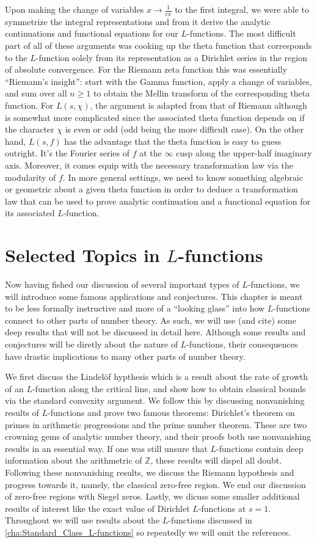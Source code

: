 \documentclass[12pt]{book}
\theoremstyle{definition}\newframedtheorem{method}{Method}
\newcommand{\Z}{\mathbb{Z}}
\newcommand{\<}{\langle}
\renewcommand{\>}{\rangle}
\begin{document}
      Upon making the change of variables $x \to \frac{1}{cx}$ to the first integral, we were able to symmetrize the integral representations and from it derive the analytic continuations and functional equations for our $L$-functions. The most difficult part of all of these arguments was cooking up the theta function that corresponds to the $L$-function solely from its representation as a Dirichlet series in the region of absolute convergence. For the Riemann zeta function this was essentially ``Riemann's insight'': start with the Gamma function, apply a change of variables, and sum over all $n \ge 1$ to obtain the Mellin transform of the corresponding theta function. For $L(s,\chi)$, the argument is adapted from that of Riemann although is somewhat more complicated since the associated theta function depends on if the character $\chi$ is even or odd (odd being the more difficult case). On the other hand, $L(s,f)$ has the advantage that the theta function is easy to guess outright. It's the Fourier series of $f$ at the $\infty$ cusp along the upper-half imaginary axis. Moreover, it comes equip with the necessary transformation law via the modularity of $f$. In more general settings, we need to know something algebraic or geometric about a given theta function in order to deduce a transformation law that can be used to prove analytic continuation and a functional equation for its associated $L$-function.
\chapter{Selected Topics in \texorpdfstring{$L$}{L}-functions}
  Now having fished our discussion of several important types of $L$-functions, we will introduce some famous applications and conjectures. This chapter is meant to be less formally instructive and more of a ``looking glass'' into how $L$-functions connect to other parts of number theory. As such, we will use (and cite) some deep results that will not be discussed in detail here. Although some results and conjectures will be diretly about the nature of $L$-functions, their consequences have drastic implications to many other parts of number theory.

  We first discuss the Lindel\"of hypthesis which is a result about the rate of growth of an $L$-function along the critical line, and show how to obtain classical bounds via the standard convexity argument. We follow this by discussing nonvanishing results of $L$-functions and prove two famous theorems: Dirichlet's theorem on primes in arithmetic progressions and the prime number theorem. These are two crowning gems of analytic number theory, and their proofs both use nonvanishing results in an essential way. If one was still unsure that $L$-functions contain deep information about the arithmetric of $\Z$, these results will dispel all doubt. Following these nonvanishing results, we discuss the Riemann hypothesis and progress towards it, namely, the classical zero-free region. We end our discussion of zero-free regions with Siegel zeros. Lastly, we dicuss some smaller additional results of interest like the exact value of Dirichlet $L$-functions at $s = 1$. Throughout we will use results about the $L$-functions discussed in \cref{cha:Standard_Class_L-functions} so repeatedly we will omit the references.
\end{document}
